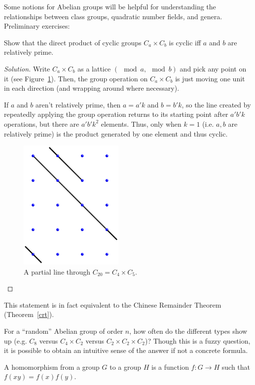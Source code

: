 Some notions for Abelian groups will be helpful for understanding the relationships between class groups, quadratic number fields, and genera. Preliminary exercises:
\begin{ex}
Show that the direct product of cyclic groups $C_a \times C_b$ is cyclic iff $a$ and $b$ are relatively prime.
\end{ex}
\begin{proof}[Solution]
Write $C_a \times C_b$ as a lattice $(\mod a,\mod b)$ and pick any point on it (see Figure~\ref{cyclattice}). Then, the group operation on $C_a\times C_b$ is just moving one unit in each direction (and wrapping around where necessary).

If $a$ and $b$ aren't relatively prime, then $a = a'k$ and $b = b'k$, so the line created by repeatedly applying the group operation returns to its starting point after $a'b'k$ operations, but there are $a'b'k^2$ elements. Thus, only when $k=1$ (i.e. $a,b$ are relatively prime) is the product generated by one element and thus cyclic.
\begin{figure}[h]
\centering
\includegraphics[width=2in]{cyclic}
\caption{A partial line through $C_{20} = C_4 \times C_5$.}
\label{cyclattice}
\end{figure}
\end{proof}
This statement is in fact equivalent to the Chinese Remainder Theorem (Theorem~\ref{crt}).
\begin{ex}
For a ``random'' Abelian group of order $n$, how often do the different types show up (e.g. $C_8$ versus $C_4\times C_2$ versus $C_2\times C_2\times C_2$)? Though this is a fuzzy question, it is possible to obtain an intuitive sense of the answer if not a concrete formula.
\end{ex}
\begin{defn}
A homomorphism from a group $G$ to a group $H$ is a function $f:G\to H$ such that $f(xy) = f(x)f(y)$.
\end{defn}
